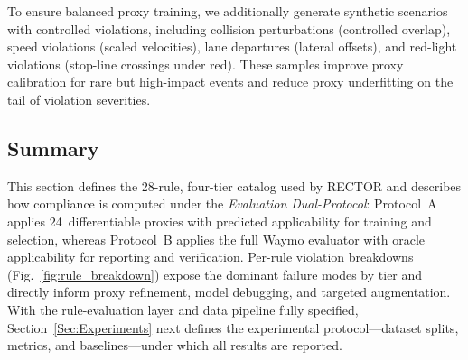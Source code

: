 To ensure balanced proxy training, we additionally generate synthetic scenarios with controlled violations, including collision perturbations (controlled overlap), speed violations (scaled velocities), lane departures (lateral offsets), and red-light violations (stop-line crossings under red). These samples improve proxy calibration for rare but high-impact events and reduce proxy underfitting on the tail of violation severities.

\subsection{Summary}
\label{subsec:rule_eval_summary}

This section defines the 28-rule, four-tier catalog used by RECTOR and describes how compliance is computed under the \emph{Evaluation Dual-Protocol}: Protocol~A applies 24~differentiable proxies with predicted applicability for training and selection, whereas Protocol~B applies the full Waymo evaluator with oracle applicability for reporting and verification.  Per-rule violation breakdowns (Fig.~\ref{fig:rule_breakdown}) expose the dominant failure modes by tier and directly inform proxy refinement, model debugging, and targeted augmentation.  With the rule-evaluation layer and data pipeline fully specified, Section~\ref{Sec:Experiments} next defines the experimental protocol---dataset splits, metrics, and baselines---under which all results are reported.
